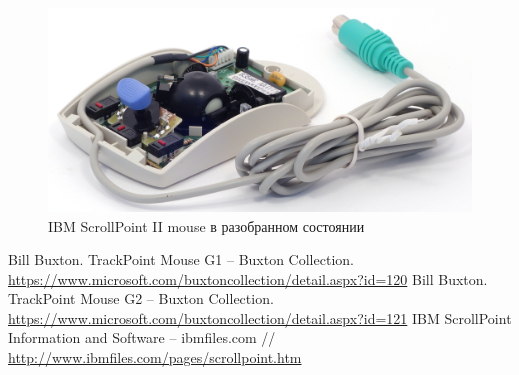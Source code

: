 \documentclass[11pt, a4paper]{article}
\begin{document}
\begin{figure}[h]
    \centering
    \includegraphics[scale=0.7]{2000_ibm_scrollpoint_ii_mouse/inside_30.jpg} 
    \caption{IBM ScrollPoint II mouse в разобранном состоянии}
    \label{fig:IBMPS2Inside}
\end{figure}

\begin{thebibliography}{9}
     Bill Buxton. TrackPoint Mouse G1 -- Buxton Collection. \url{https://www.microsoft.com/buxtoncollection/detail.aspx?id=120}
     Bill Buxton. TrackPoint Mouse G2 -- Buxton Collection. \url{https://www.microsoft.com/buxtoncollection/detail.aspx?id=121}
     IBM ScrollPoint Information and Software -- ibmfiles.com // \url{http://www.ibmfiles.com/pages/scrollpoint.htm}
\end{thebibliography}
\end{document}
